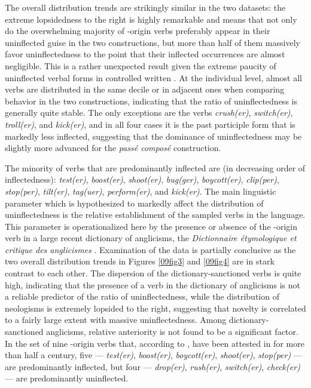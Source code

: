 \documentclass[output=paper,colorlinks,citecolor=brown]{langscibook}
\begin{document}
The overall distribution trends are strikingly similar in the two datasets: the extreme lopsidedness to the right is highly remarkable and means that not only do the overwhelming majority of -origin verbs preferably appear in their uninflected guise in the two constructions, but more than half of them massively favor uninflectedness to the point that their inflected occurrences are almost negligible. This is a rather unexpected result given the extreme paucity of uninflected verbal forms in controlled written . At the individual level, almost all verbs are distributed in the same decile or in adjacent ones when comparing behavior in the two constructions, indicating that the ratio of uninflectedness is generally quite stable. The only exceptions are the verbs \emph{crush(er)}, \emph{switch(er)}, \emph{troll(er)}, and \emph{kick(er)}, and in all four cases it is the past participle form
that is markedly less inflected, suggesting that the dominance of uninflectedness may be slightly more advanced for the \emph{passé composé} construction.

The minority of verbs that are predominantly inflected are (in decreasing order of inflectedness): \emph{test(er)}, \emph{boost(er)},
\emph{shoot(er)}, \emph{bug(ger)}, \emph{boycott(er)}, \emph{clip(per)}, \emph{stop(per)}, \emph{tilt(er)}, \emph{tag(uer)}, \emph{perform(er)}, and \emph{kick(er)}. The main linguistic parameter which is hypothesized to markedly affect the distribution of uninflectedness is the relative establishment of the sampled verbs in the  language. This parameter is operationalized here by the presence or absence of the -origin verb in a large recent  dictionary of anglicisms, the \emph{Dictionnaire étymologique et critique des anglicismes} \citep{weisman2020}. Examination of the data is partially conclusive as the two overall distribution trends in Figures \ref{09fig3} and \ref{09fig4} are in stark contrast to each other. The dispersion of the dictionary-sanctioned verbs is quite high, indicating that the presence of a verb in the dictionary of anglicisms is not a reliable predictor of the ratio of uninflectedness, while the distribution of neologisms is extremely lopsided to the right, suggesting that novelty is correlated to a fairly large extent with massive uninflectedness. Among dictionary-sanctioned anglicisms, relative anteriority is not found to be a significant factor. In the set of nine -origin verbs that, according to \citet{weisman2020}, have been attested in  for more than half a century, five --- \emph{test(er)}, \emph{boost(er)}, \emph{boycott(er)}, \emph{shoot(er)}, \emph{stop(per)} --- are predominantly inflected, but four --- \emph{drop(er)}, \emph{rush(er)}, \emph{switch(er)}, \emph{check(er)} --- are predominantly uninflected.
\end{document}
